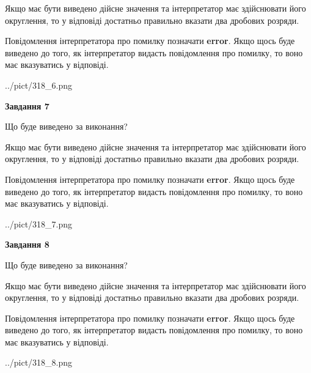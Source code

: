 \documentclass[12pt, ukrainian]{article}
\begin{document}
{\begin {Large}
Якщо має бути виведено дійсне значення та інтерпретатор має здійснювати його округлення, 
то у відповіді достатньо правильно вказати два дробових розряди.

Повідомлення інтерпретатора про помилку позначати \textbf{error}.
Якщо щось буде виведено до того, як інтерпретатор видасть повідомлення про помилку, 
то воно має вказуватись у відповіді. \par

\begin{center}
	{../pict/318_6.png}
\end{center}
\newpage

{\begin {center}\textbf{Завдання 7}\end {center}}\par
Що буде виведено за виконання? \par

Якщо має бути виведено дійсне значення та інтерпретатор має здійснювати його округлення, 
то у відповіді достатньо правильно вказати два дробових розряди.

Повідомлення інтерпретатора про помилку позначати \textbf{error}.
Якщо щось буде виведено до того, як інтерпретатор видасть повідомлення про помилку, 
то воно має вказуватись у відповіді. \par

\begin{center}
	{../pict/318_7.png}
\end{center}
\newpage

{\begin {center}\textbf{Завдання 8}\end {center}}\par
Що буде виведено за виконання? \par

Якщо має бути виведено дійсне значення та інтерпретатор має здійснювати його округлення, 
то у відповіді достатньо правильно вказати два дробових розряди.

Повідомлення інтерпретатора про помилку позначати \textbf{error}.
Якщо щось буде виведено до того, як інтерпретатор видасть повідомлення про помилку, 
то воно має вказуватись у відповіді. \par

\begin{center}
	{../pict/318_8.png}
\end{center}
\newpage


\end{Large}}
\end{document}
